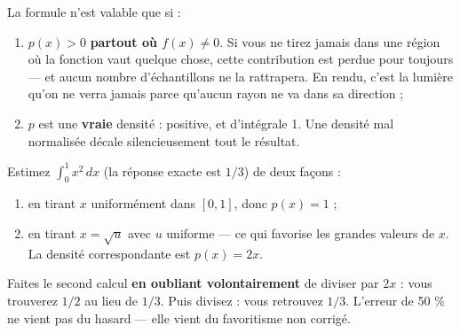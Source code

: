 \begin{nkpiege}
La formule n'est valable que si :
\begin{enumerate}
  \item $p(x) > 0$ \textbf{partout où $f(x) \neq 0$}. Si vous ne tirez jamais
        dans une région où la fonction vaut quelque chose, cette contribution
        est perdue pour toujours — et aucun nombre d'échantillons ne la
        rattrapera. En rendu, c'est la lumière qu'on ne verra jamais parce
        qu'aucun rayon ne va dans sa direction ;
  \item $p$ est une \textbf{vraie} densité : positive, et d'intégrale 1. Une
        densité mal normalisée décale silencieusement tout le résultat.
\end{enumerate}
\end{nkpiege}

\begin{nkexo}
Estimez $\int_0^1 x^2\,dx$ (la réponse exacte est $1/3$) de deux façons :

\begin{enumerate}
  \item en tirant $x$ uniformément dans $[0,1]$, donc $p(x) = 1$ ;
  \item en tirant $x = \sqrt{u}$ avec $u$ uniforme — ce qui favorise les
        grandes valeurs de $x$. La densité correspondante est $p(x) = 2x$.
\end{enumerate}

Faites le second calcul \textbf{en oubliant volontairement} de diviser par
$2x$ : vous trouverez $1/2$ au lieu de $1/3$. Puis divisez : vous retrouvez
$1/3$. L'erreur de 50 \% ne vient pas du hasard — elle vient du favoritisme non
corrigé.
\end{nkexo}
